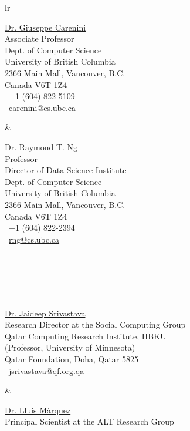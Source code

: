 \documentclass[paper=letter,fontsize=11pt]{scrartcl} %
\begin{document}
\begin{tabular}{lr}
\\
\begin{minipage}[t]{3.5in}
\href{https://www.cs.ubc.ca/~carenini/} {Dr. Giuseppe Carenini}\\
Associate Professor\\ 
Dept. of Computer Science \\ 
University of British Columbia\\
2366 Main Mall, Vancouver, B.C.\\
Canada V6T 1Z4 \\
\Telefon\ +1 (604) 822-5109\\
\Letter\ \href{mailto:carenini@cs.ubc.ca}{carenini@cs.ubc.ca}
\end{minipage}
&
\begin{minipage}[t]{3.5in}
\href{https://www.cs.ubc.ca/~rng/} {Dr. Raymond T. Ng}\\
Professor \\ 
Director of Data Science Institute \\
Dept. of Computer Science \\ 
University of British Columbia\\
2366 Main Mall, Vancouver, B.C.\\
Canada V6T 1Z4 \\
\Telefon\ +1 (604) 822-2394\\
\Letter\ \href{mailto:rng@cs.ubc.ca}{rng@cs.ubc.ca}
\end{minipage}
\\
\\
\\
\\
\begin{minipage}[t]{3.5in}
\href{http://dmr.cs.umn.edu/people2.html} {Dr. Jaideep Srivastava}\\
Research Director at the Social Computing Group \\
Qatar Computing Research Institute, HBKU\\
(Professor, University of Minnesota)\\
Qatar Foundation, Doha, Qatar 5825\\
\Letter\ \href{mailto:jsrivastava@qf.org.qa}{jsrivastava@qf.org.qa}
\end{minipage}
&
\begin{minipage}[t]{3.5in}
\href{http://qcri.org.qa/page?name=Lluis_Marquez&a=117&pid=145&lang=en-CA} {Dr. Lluís Màrquez}\\
Principal Scientist at the ALT Research Group\\

\end{minipage}
\end{tabular}
\end{document}
